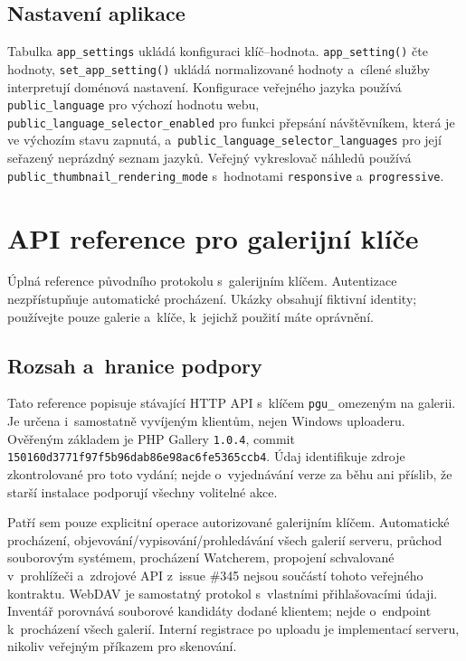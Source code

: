 \documentclass[11pt,a4paper]{article}
\newcommand{\setting}[1]{\nolinkurl{#1}}
\newcommand{\codeword}[1]{\nolinkurl{#1}}
\begin{document}
\subsection{Nastavení aplikace}

Tabulka \codeword{app_settings} ukládá konfiguraci klíč--hodnota.
\codeword{app_setting()} čte hodnoty, \codeword{set_app_setting()} ukládá
normalizované hodnoty a~cílené služby interpretují doménová nastavení.
Konfigurace veřejného jazyka používá \setting{public_language} pro výchozí
hodnotu webu, \setting{public_language_selector_enabled} pro funkci přepsání
návštěvníkem, která je ve výchozím stavu zapnutá,
a~\setting{public_language_selector_languages} pro její seřazený neprázdný
seznam jazyků. Veřejný vykreslovač náhledů používá
\setting{public_thumbnail_rendering_mode} s~hodnotami \setting{responsive}
a~\setting{progressive}.



\section{API reference pro galerijní klíče}

\label{sec:gallery-key-api}


Úplná reference původního protokolu s~galerijním klíčem. Autentizace nezpřístupňuje
automatické procházení. Ukázky obsahují fiktivní identity; používejte pouze galerie a~klíče,
k~jejichž použití máte oprávnění.

\subsection{\texorpdfstring{Rozsah a~hranice podpory}{Rozsah a hranice podpory}}

\label{api352:scope}

Tato reference popisuje stávající HTTP API s~klíčem \codeword{pgu_} omezeným na galerii. Je
určena i~samostatně vyvíjeným klientům, nejen Windows uploaderu. Ověřeným základem je PHP
Gallery \codeword{1.0.4}, commit \codeword{150160d3771f97f5b96dab86e98ac6fe5365ccb4}. Údaj
identifikuje zdroje zkontrolované pro toto vydání; nejde o~vyjednávání verze za běhu ani
příslib, že starší instalace podporují všechny volitelné akce.

Patří sem pouze explicitní operace autorizované galerijním klíčem. Automatické procházení,
objevování/vypisování/prohledávání všech galerií serveru, průchod souborovým systémem,
procházení Watcherem, propojení schvalované v~prohlížeči a~zdrojové API z~issue \#345 nejsou
součástí tohoto veřejného kontraktu. WebDAV je samostatný protokol s~vlastními
přihlašovacími údaji. Inventář porovnává souborové kandidáty dodané klientem; nejde
o~endpoint k~procházení všech galerií. Interní registrace po uploadu je implementací
serveru, nikoliv veřejným příkazem pro skenování.
\end{document}
